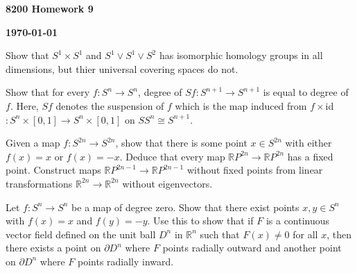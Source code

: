 \documentclass[12pt]{article}
\begin{document}
\begin{newtitle}
  \begin{center}
    \textbf{\Huge 8200 Homework 9}
  \end{center}
  \textbf{} \hfill \textbf{\today}
\end{newtitle}

\begin{statement}[1]
  Show that $S^1 \times S^1$ and $S^1 \vee S^1 \vee S^2$ has isomorphic homology groups in all dimensions, but thier universal 
  covering spaces do not.
\end{statement}
\begin{newproof}

\end{newproof}

\begin{statement}[2]
  Show that for every $f:S^n \to S^n$, degree of $Sf:S^{n+1} \to S^{n+1}$ is equal to degree of $f$. Here, $Sf$ denotes the suspension of $f$ 
  which is the map induced from $f \times$id$:S^n \times [0,1] \to S^n \times [0,1]$ on $SS^n \cong S^{n+1}$. 
\end{statement}
\begin{newproof}

\end{newproof}

\begin{statement}[3]
  Given a map $f: S^{2n} \to S^{2n}$, show that there is some point $x \in S^{2n}$ with either $f(x)=x$ or $f(x)=-x$. Deduce that 
  every map $\mathbb{R}P^{2n} \to \mathbb{R}P^{2n}$ has a fixed point. Construct maps $\mathbb{R}P^{2n-1} \to \mathbb{R}P^{2n-1}$
  without fixed points from linear transformations $\mathbb{R}^{2n} \to \mathbb{R}^{2n}$ without eigenvectors. 
\end{statement}
\begin{newproof}

\end{newproof}

\begin{statement}[4]
  Let $f:S^n \to S^n$ be a map of degree zero. Show that there exist points $x,y \in S^n$ with $f(x)=x$ and $f(y)=-y$. Use this to 
  show that if $F$ is a continuous vector field defined on the unit ball $D^n$ in $\mathbb{R}^n$ such that $F(x) \neq 0$ 
  for all $x$, then there exists a point on $\partial D^n$ where $F$ points radially outward and another point on 
  $\partial D^n$ where $F$ points radially inward. 
\end{statement}
\begin{newproof}

\end{newproof}
\end{document}
